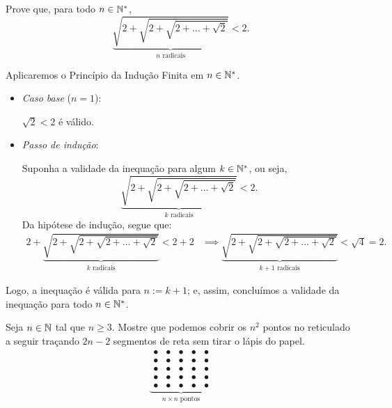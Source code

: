 \begin{example}
Prove  que, para todo $n \in \mathbb{N}^*$,
%
\begin{equation*}
\underbrace{\sqrt{2+\sqrt{2+\sqrt{2+ \dots + \sqrt 2}}}}_{n  \text{ radicais}} < 2.
\end{equation*}
\end{example}

\begin{solution}
Aplicaremos o Princípio da Indução Finita em $n \in \mathbb{N}^*$.
%
\begin{itemize}
	\item \textit{Caso base} ($n=1$):

	$\sqrt 2 < 2$ é válido.

	\item \textit{Passo de indução}:

	Suponha a validade da inequação para algum $k \in \mathbb{N}^*$, ou seja, 
	\begin{equation*}
	\underbrace{\sqrt{2+\sqrt{2+\sqrt{2+ \dots + \sqrt 2}}}}_{k  \text{ radicais}} < 2.
	\end{equation*}
	Da hipótese de indução, segue que:
	\begin{align*}
	2+\underbrace{\sqrt{2+\sqrt{2+\sqrt{2+ \dots + \sqrt 2}}}}_{k  \text{ radicais}} < 2+2 & \implies \underbrace{\sqrt{2+\sqrt{2+\sqrt{2+ \dots + \sqrt 2}}}}_{k+1  \text{ radicais}} < \sqrt 4 = 2.
	\end{align*}
\end{itemize}
%
Logo, a inequação é válida para $n := k+1$; e, assim, concluímos a validade da inequação para todo $n \in \mathbb{N}^*$.
\end{solution}

\begin{example}
Seja $n \in \mathbb{N}$ tal que $n\ge 3$. Mostre  que podemos cobrir os $n^2$ pontos no reticulado a seguir traçando $2n-2$ segmentos de reta sem tirar o lápis do papel.
%
\begin{equation*}
\underbrace{\begin{array}{ccccc}
                \bullet & \bullet & \bullet & \bullet & \bullet \\
                \bullet & \bullet & \bullet & \bullet & \bullet \\
                \bullet & \bullet & \bullet & \bullet & \bullet \\
                \bullet & \bullet & \bullet & \bullet & \bullet \\
                \bullet & \bullet & \bullet & \bullet & \bullet
              \end{array}
}_{n \times n \text{ pontos}}
\end{equation*}
\end{example}

